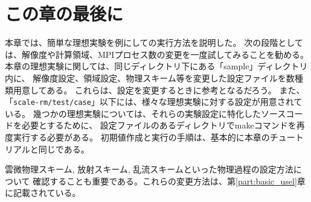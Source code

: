 \section{この章の最後に} \label{sec:ideal_exp_last}

本章では、簡単な理想実験を例にして{\scalerm}の実行方法を説明した。
次の段階としては、解像度や計算領域、MPIプロセス数の変更を一度試してみることを勧める。
本章の理想実験に関しては、同じディレクトリ下にある「sample」ディレクトリ内に、
解像度設定、領域設定、物理スキーム等を変更した設定ファイルを数種類用意してある。
これらは、設定を変更するときに参考となるだろう。
また、「\verb|scale-rm/test/case|」以下には、様々な理想実験に対する設定が用意されている。
幾つかの理想実験については、それらの実験設定に特化したソースコードを必要とするために、
設定ファイルのあるディレクトリでmakeコマンドを再度実行する必要がある。
初期値作成と実行の手順は、基本的に本章のチュートリアルと同じである。

雲微物理スキーム, 放射スキーム, 乱流スキームといった物理過程の設定方法について
確認することも重要である。これらの変更方法は、第\ref{part:basic_usel}章に記載されている。
